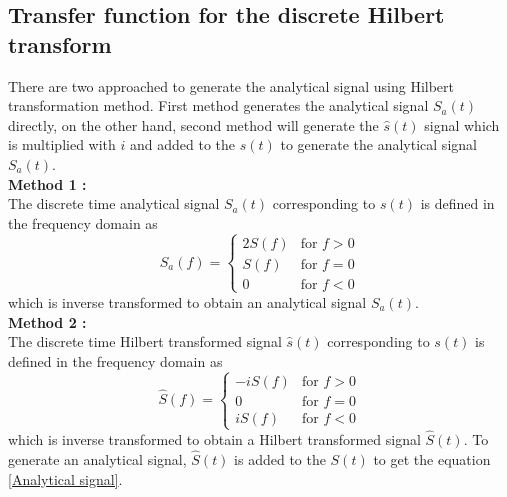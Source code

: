 \subsection*{Transfer function for the discrete Hilbert transform}
There are two approached to generate the analytical signal using Hilbert transformation method. First method generates the analytical signal $S_a(t)$ directly, on the other hand, second method will generate the $\hat{s}(t)$ signal which is multiplied with $i$ and added to the ${s}(t)$ to generate the analytical signal $S_a(t)$.\\
\textbf{Method 1 :}\\
The discrete time analytical signal $S_a(t)$ corresponding to  ${s}(t)$ is defined in the frequency domain as
\begin{equation}
S_a(f) = \begin{cases}
2S(f) &\text{for $f>0$}\\
S(f) &\text{for $f=0$}\\
0 &\text{for $f<0$}
\end{cases}
\end{equation}
which is inverse transformed to obtain an analytical signal $S_a(t)$.\\
\textbf{Method 2 :}\\
The discrete time Hilbert transformed signal  $\hat{s}(t)$ corresponding to  ${s}(t)$ is defined in the frequency domain as
\begin{equation}
 \hat{S}(f)= \begin{cases}
-i S(f) &\text{for $f>0$}\\
0 &\text{for $f=0$}\\
i S(f) &\text{for $f<0$}
\end{cases}
\end{equation}
which is inverse transformed to obtain a Hilbert transformed signal $\hat{S}(t)$. To generate an analytical signal,  $\hat{S}(t)$ is added to the $S(t)$ to get the equation \ref{Analytical signal}.\\
